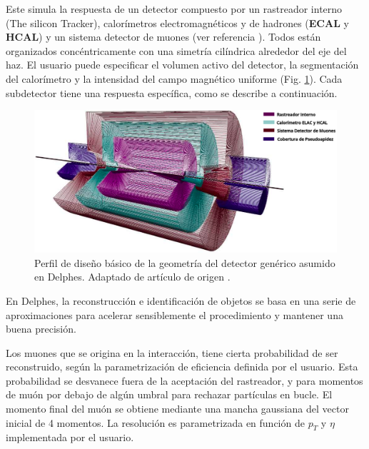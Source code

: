 Este simula la respuesta de un detector compuesto por un rastreador interno (The silicon Tracker), calorímetros electromagnéticos y de hadrones (\textbf{ECAL} y \textbf{HCAL}) y un sistema detector de muones (ver referencia \cite{de_favereau_delphes_2014}). Todos están organizados concéntricamente con una simetría cilíndrica alrededor del eje del haz. El usuario puede especificar el volumen activo del detector, la segmentación del calorímetro y la intensidad del campo magnético uniforme (Fig. \ref{delphes}). Cada subdetector tiene una respuesta específica, como se describe a continuación.

\begin{figure}[h!]
    \centering
    \includegraphics[width=1\textwidth]{Analisis_y_Resultados/imagenes/delphes.png}
    \caption{Perfil de diseño básico de la geometría del detector genérico asumido en Delphes. Adaptado de artículo de origen \cite{alwall_automated_2014}.}
    \label{delphes}
\end{figure}

En Delphes, la reconstrucción e identificación de objetos se basa en una serie de aproximaciones para acelerar sensiblemente el procedimiento y mantener una buena precisión. 

Los muones que se origina en la interacción, tiene cierta probabilidad de ser reconstruido, según la parametrización de eficiencia definida por el usuario. Esta probabilidad se desvanece fuera de la aceptación del rastreador, y para momentos de muón por debajo de algún umbral para rechazar partículas en bucle. El momento final del muón se obtiene mediante una mancha gaussiana del vector inicial de 4 momentos. La resolución es parametrizada en función de $p_T$ y $\eta$ implementada por el usuario.

